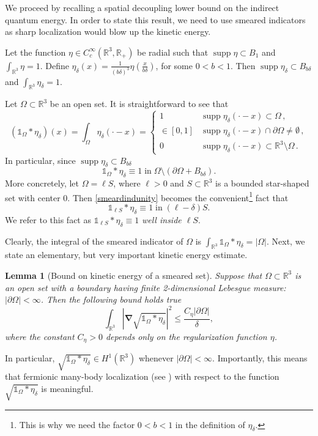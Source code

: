 \documentclass[final,onefignum,onetabnum,reqno]{amsart}
\newtheorem{lemma}[theorem]{Lemma}
\theoremstyle{remark}
\renewcommand{\le}{\leqslant}
\DeclareMathOperator{\supp}{supp}
\newcommand{\RR}{\mathbb{R}}
\newcommand{\iden}{\mathbb{1}} %
\newcommand{\grad}{\bm{\nabla}} %
\begin{document}
We proceed by recalling a spatial decoupling lower bound on the indirect quantum energy.  In order to state this result, we need to use smeared indicators as sharp localization would blow up the kinetic energy.

Let the function $\eta\in C_c^\infty(\RR^3,\RR_+)$ be radial such that $\supp\eta\subset B_1$ and $\int_{\RR^3}\eta=1$. Define
$\eta_\delta(x)=\frac{1}{(b\delta)^3}\eta\left(\frac{x}{b\delta}\right)$,
for some $0<b<1$.
Then $\supp\eta_\delta\subset B_{b\delta}$ and $\int_{\RR^3} \eta_\delta=1$.

Let $\Omega\subset\RR^3$ be an open set. 
It is straightforward to see that
\begin{equation}\label{smearcases}
(\iden_\Omega * \eta_\delta)(x)=\int_\Omega \eta_\delta(\cdot-x)=\begin{cases}
1 & \supp\eta_\delta(\cdot-x)\subset \Omega \, ,\\
\in[0,1] & \supp\eta_\delta(\cdot-x)\cap \partial\Omega\neq \emptyset\, ,\\
0 & \supp\eta_\delta(\cdot-x)\subset \RR^3\setminus \Omega \,.
\end{cases}
\end{equation}
In particular, since $\supp\eta_\delta\subset B_{b\delta}$
\begin{equation}\label{smeardindunity}
\iden_{\Omega} * \eta_\delta\equiv 1 \;\text{in}\; \Omega\setminus (\partial\Omega+B_{b\delta} ).
\end{equation}
More concretely, let $\Omega=\ell S$, where $\ell>0$ and $S\subset\RR^3$ is a bounded star-shaped set with center 0.
Then \cref{smeardindunity} becomes the convenient\footnote{This is why we need the factor $0<b<1$ in the definition of $\eta_\delta$.} fact that
$$
\iden_{\ell S} * \eta_\delta\equiv 1 \;\text{in}\; (\ell-\delta)S.
$$
We refer to this fact as $\iden_{\ell S} * \eta_\delta\equiv 1$ \emph{well inside $\ell S$}.

Clearly, the integral of the smeared indicator of $\Omega$ is
$\int_{\RR^3} \iden_\Omega * \eta_\delta = |\Omega|$.
Next, we state an elementary, but very important kinetic energy estimate.

\begin{lemma}[Bound on kinetic energy of a smeared set]\label{indgradlemma}
Suppose that $\Omega\subset\RR^3$ is an open set with a boundary having finite 2-dimensional Lebesgue measure: $|\partial\Omega|<\infty$. 
Then the following bound holds true
$$
\int_{\RR^3} \left|\grad \sqrt{\iden_\Omega*\eta_\delta}\right|^2\le \frac{C_\eta|\partial\Omega|}{\delta},
$$
where the constant $C_\eta>0$ depends only on the regularization function $\eta$.
\end{lemma}
In particular, $\sqrt{\iden_\Omega*\eta_\delta}\in H^1(\RR^3)$ whenever $|\partial\Omega|<\infty$. Importantly, this means that fermionic many-body localization (see \cite[Appendix A]{hainzl2009thermodynamic}) with respect to the function $\sqrt{\iden_\Omega*\eta_\delta}$ is meaningful.
\end{document}
